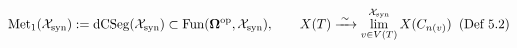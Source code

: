 \documentclass[preview]{standalone}
\begin{document}
\begin{align*}
\special{dvisvgm:raw <g id='unique000'>}\operatorname{Met}_1(\mathcal{X}_{\text{syn}}) := \operatorname{dCSeg}(\mathcal{X}_{\text{syn}}) \subset \operatorname{Fun}(\mathbf{\Omega}^{\text{op}}, \mathcal{X}_{\text{syn}}), \qquad X(T) \xrightarrow{\;\sim\;} \lim_{v\in V(T)}^{\mathcal{X}_{\text{syn}}} X(C_{n(v)})\;\;(\text{Def 5.2})\special{dvisvgm:raw </g>}
\end{align*}
\end{document}
